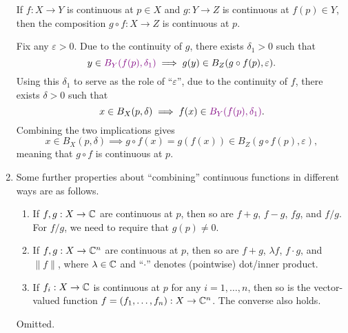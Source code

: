 \begin{enumerate}
\begin{proposition}
\label{prp:compo-cts}
If \(f:X\to Y\) is continuous at \(p\in X\) and \(g:Y\to Z\) is continuous at
\(f(p)\in Y\), then the composition \(g\circ f:X\to Z\) is continuous at \(p\).
\end{proposition}
\begin{pf}
Fix any \(\varepsilon>0\). Due to the continuity of \(g\), there exists
\(\delta_1>0\) such that
\[
y\in {\color{violet}B_Y(f(p),\delta_1)}\implies g(y)\in B_Z(g\circ f(p),\varepsilon).
\]
Using this \(\delta_1\) to serve as the role of ``\(\varepsilon\)'', due to the
continuity of \(f\), there exists \(\delta>0\) such that
\[
x\in B_X(p,\delta)\implies f(x)\in {\color{violet}B_Y(f(p),\delta_1)}.
\]
Combining the two implications gives
\[
x\in B_X(p,\delta)\implies g\circ f(x)=g(f(x))\in B_Z(g\circ f(p),\varepsilon),
\]
meaning that \(g\circ f\) is continuous at \(p\).
\end{pf}
\item Some further properties about ``combining'' continuous functions in
different ways are as follows.
\begin{proposition}
\label{prp:cts-prop}
\hfill
\begin{enumerate}
\item If \(f,g:X\to\mathbb{C}\) are continuous at \(p\), then so are \(f+g\), \(f-g\),
\(fg\), and \(f/g\). For \(f/g\), we need to require that \(g(p)\ne 0\).
\item If \(f,g:X\to\mathbb{C}^n\) are continuous at \(p\), then so are \(f+g\),
\(\lambda f\), \(f\cdot g\), and \(\|f\|\), where \(\lambda\in\mathbb{C}\) and
``\(\cdot\)'' denotes (pointwise) dot/inner product.
\item If \(f_i:X\to\mathbb{C}\) is continuous at \(p\) for any \(i=1,\dotsc,n\), then
so is the vector-valued function \(f=(f_1,\dotsc,f_n):X\to\mathbb{C}^n\). The converse
also holds.
\end{enumerate}
\end{proposition}
\begin{pf}
Omitted.
\end{pf}

\end{enumerate}

